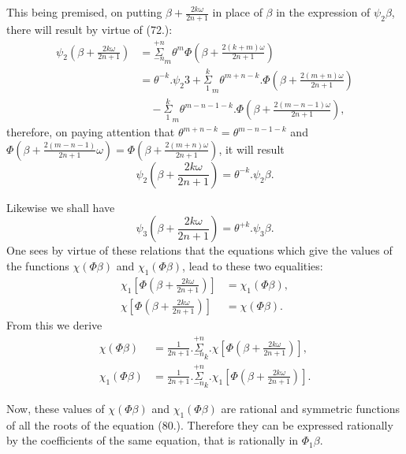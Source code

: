 \documentclass{article}
\begin{document}
This being premised, on putting $\beta+\frac{2k\omega}{2n+1}$ in place of $\beta$ in the expression of $\psi_{2}\beta$, there will result by virtue of (72.):
\[ \begin{aligned}
\psi_{2}\left(\beta+\frac{2k\omega}{2n+1}\right)&=\overset{+n}{\underset{-n}{\Sigma}}_{m}\theta^{m}\Phi\left(\beta+\frac{2(k+m)\omega}{2n+1}\right)\\
&=\theta^{-k}.\psi_{2}3+\overset{k}{\underset{1}{\Sigma}}_{m}\theta^{m+n-k}.\Phi\left(\beta+\frac{2(m+n)\omega}{2n+1}\right)\\
&\quad-\overset{k}{\underset{1}{\Sigma}}_{m}\theta^{m-n-1-k}.\Phi\left(\beta+\frac{2(m-n-1)\omega}{2n+1}\right),
\end{aligned} \]
therefore, on paying attention that $\theta^{m+n-k}=\theta^{m-n-1-k}$ and $\Phi\left(\beta+\frac{2(m-n-1)}{2n+1}\omega\right)=\Phi\left(\beta+\frac{2(m+n)\omega}{2n+1}\right)$, it will result
\[ \psi_{2}\left(\beta+\frac{2k\omega}{2n+1}\right)=\theta^{-k}.\psi_{2}\beta. \tag{81.} \]

Likewise we shall have
\[ \psi_{3}\left(\beta+\frac{2k\omega}{2n+1}\right)=\theta^{+k}.\psi_{3}\beta. \]
One sees by virtue of these relations that the equations which give the values of the functions $\chi(\Phi\beta)$ and $\chi_{1}(\Phi\beta)$, lead to these two equalities:
\[ \begin{aligned}
\chi_{1}\left[\Phi\left(\beta+\frac{2k\omega}{2n+1}\right)\right]&=\chi_{1}(\Phi\beta),\\
\chi\left[\Phi\left(\beta+\frac{2k\omega}{2n+1}\right)\right]&=\chi(\Phi\beta).
\end{aligned} \]
From this we derive
\[ \begin{aligned}
\chi(\Phi\beta)&=\frac{1}{2n+1}.\overset{+n}{\underset{-n}{\Sigma}}_{k}.\chi\left[\Phi\left(\beta+\frac{2k\omega}{2n+1}\right)\right],\\
\chi_{1}(\Phi\beta)&=\frac{1}{2n+1}.\overset{+n}{\underset{-n}{\Sigma}}_{k}.\chi_{1}\left[\Phi\left(\beta+\frac{2k\omega}{2n+1}\right)\right].
\end{aligned} \]

Now, these values of $\chi(\Phi\beta)$ and $\chi_{1}(\Phi\beta)$ are rational and symmetric functions of all the roots of the equation (80.). Therefore they can be expressed rationally by the coefficients of the same equation, that is rationally in $\Phi_{1}\beta$.
\end{document}
